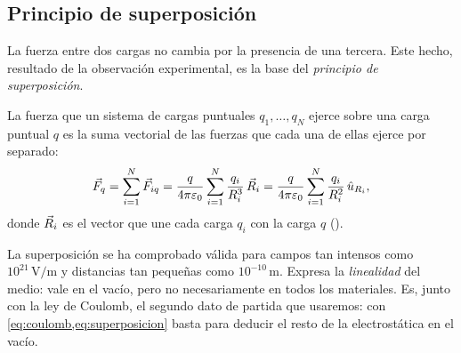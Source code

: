 \subsection{Principio de superposición}\label{sec:superposicion}
La fuerza entre dos cargas no cambia por la presencia de una tercera. Este hecho, resultado de la observación
experimental, es la base del \emph{principio de superposición}.

\begin{definicion}\label{def:superposicion}
La fuerza que un sistema de cargas puntuales $q_1,\dots,q_N$ ejerce sobre una carga puntual $q$ es la suma
vectorial de las fuerzas que cada una de ellas ejerce por separado:
\begin{equation}\label{eq:superposicion}
  \vec{F}_q=\sum_{i=1}^{N}\vec{F}_{iq}=\frac{q}{4\pi\varepsilon_{0}}\sum_{i=1}^{N}\frac{q_i}{R_i^{3}}\,\vec{R}_i
  =\frac{q}{4\pi\varepsilon_{0}}\sum_{i=1}^{N}\frac{q_i}{R_i^{2}}\,\hat{u}_{R_i},
\end{equation}
donde $\vec{R}_i$ es el vector que une cada carga $q_i$ con la carga $q$ ().
\end{definicion}

\begin{observacion}[Validez]\label{obs:superposicion}
La superposición se ha comprobado válida para campos tan intensos como $10^{21}\,\mathrm{V/m}$ y distancias
tan pequeñas como $10^{-10}\,\mathrm{m}$. Expresa la \emph{linealidad} del medio: vale en el vacío, pero
no necesariamente en todos los materiales. Es, junto con la ley de Coulomb, el segundo dato de partida que usaremos:
con \cref{eq:coulomb,eq:superposicion} basta para deducir el resto de la electrostática en el vacío.
\end{observacion}
